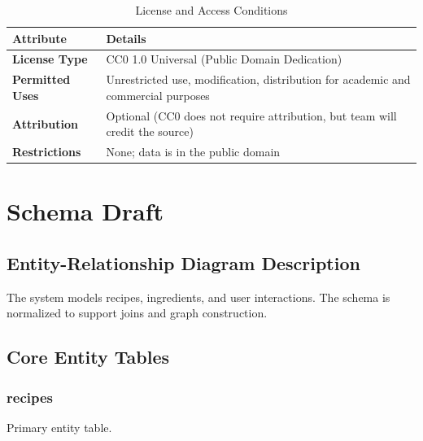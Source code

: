 \documentclass[11pt,a4paper]{article}
\begin{document}
\begin{table}[H]
    \centering
    \begin{tabular}{|p{4cm}|p{9cm}|}
        \hline
        \textbf{Attribute} & \textbf{Details} \\
        \hline
        \textbf{License Type} & CC0 1.0 Universal (Public Domain Dedication) \\
        \hline
        \textbf{Permitted Uses} & Unrestricted use, modification, distribution for academic and commercial purposes \\
        \hline
        \textbf{Attribution} & Optional (CC0 does not require attribution, but team will credit the source) \\
        \hline
        \textbf{Restrictions} & None; data is in the public domain \\
        \hline
    \end{tabular}
    \caption{License and Access Conditions}
    \label{tab:license}
\end{table}

\newpage

\section{Schema Draft}

\subsection{Entity-Relationship Diagram Description}

The system models recipes, ingredients, and user interactions. The schema is normalized to support joins and graph construction.

\subsection{Core Entity Tables}

\subsubsection{recipes}

Primary entity table.
\end{document}
